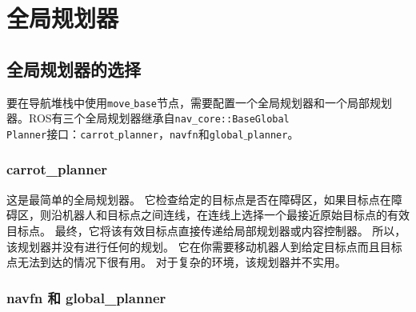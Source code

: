 \section[Global Planner]{全局规划器}

\subsection[Global Planner Selection]{全局规划器的选择}


要在导航堆栈中使用\texttt{move$\_$base}节点，需要配置一个全局规划器和一个局部规划器。ROS有三个全局规划器继承自\texttt{nav\_core::BaseGlobal\\Planner}接口：\texttt{carrot$\_$planner}，\texttt{navfn}和\texttt{global$\_$planner}。

\subsubsection{carrot\_planner}


这是最简单的全局规划器。 
它检查给定的目标点是否在障碍区，如果目标点在障碍区，则沿机器人和目标点之间连线，在连线上选择一个最接近原始目标点的有效目标点。 
最终，它将该有效目标点直接传递给局部规划器或内容控制器。
所以，该规划器并没有进行任何的规划。
它在你需要移动机器人到给定目标点而且目标点无法到达的情况下很有用。
对于复杂的环境，该规划器并不实用。

\subsubsection[navfn and global\_planner]{navfn 和 global\_planner}

